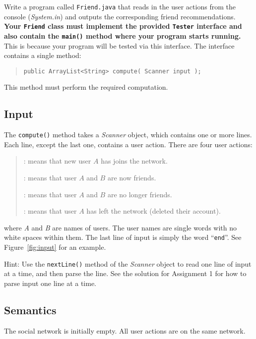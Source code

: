 \documentclass[12pt,pdftex]{article}
\begin{document}
Write a program called {\tt Friend.java} that reads in the user actions
from the console ({\it System.in}) and outputs the corresponding 
friend recommendations.  {\bf Your {\tt Friend} class must implement
the provided {\tt Tester} interface and also contain the {\tt main()}
method where your program starts running.}  This is because your
program will be tested via this interface.  The interface contains
a single method:
\begin{quote}
\begin{verbatim}
public ArrayList<String> compute( Scanner input );
\end{verbatim}
\end{quote}
This method must perform the required computation.

\subsection*{Input}
The {\tt compute()} method takes a {\it Scanner} object, which contains 
one or more lines.  Each line, except the last one, contains a user
action.  There are four user actions:
\begin{quote}
\begin{description}\NoItemSpace
\item[{\tt A joins}]: means that new user $A$ has joins the network.
\item[{\tt A friends B}]: means that user $A$ and $B$ are now friends.
\item[{\tt A unfriends B}]: means that user $A$ and $B$ are no longer friends.
\item[{\tt A leaves}]: means that user $A$ has left the network (deleted 
                     their account).  
\end{description}
\end{quote}
where {\it A} and {\it B} are names of users.  The user names are
single words with no white spaces within them.  The last line of
input is simply the word ``{\tt end}''.  See Figure~\ref{fig:input}
for an example.

Hint:  Use the {\tt nextLine()} method of the {\it Scanner} object to 
read one line of input at a time, and then parse the line.  See the 
solution for Assignment 1 for how to parse input one line at a time.


\subsection*{Semantics}
The social network is initially empty.  All user actions are on the
same network.  
\end{document}
